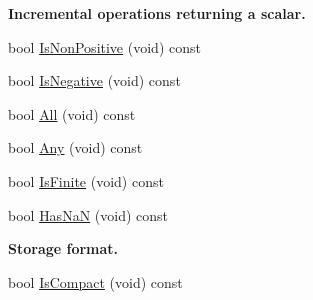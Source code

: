 \begin{Indent}{\bf Incremental operations returning a scalar.}
\begin{DoxyCompactItemize}
bool \hyperlink{classvct_dynamic_const_n_array_base_a6db845f0bc3dc8a202f01efcbd324534}{Is\-Non\-Positive} (void) const 
\item 
bool \hyperlink{classvct_dynamic_const_n_array_base_aa857ba5eb1c2e42c835d64812d189e02}{Is\-Negative} (void) const 
\item 
bool \hyperlink{classvct_dynamic_const_n_array_base_a28488dcd24829cba9e3d2a45d8627c16}{All} (void) const 
\item 
bool \hyperlink{classvct_dynamic_const_n_array_base_aae8f05f6031a18f2289f6bb3a7fb5062}{Any} (void) const 
\item 
bool \hyperlink{classvct_dynamic_const_n_array_base_a75a5eb704992360d1c94e61190e3e052}{Is\-Finite} (void) const 
\item 
bool \hyperlink{classvct_dynamic_const_n_array_base_ab610e1bff1589b1198abe536e7023e54}{Has\-Na\-N} (void) const 
\end{DoxyCompactItemize}
\end{Indent}
\begin{Indent}{\bf Storage format.}\par
\begin{DoxyCompactItemize}
\item 
bool \hyperlink{classvct_dynamic_const_n_array_base_a55cacc58ae8e57eba5121566689611dc}{Is\-Compact} (void) const 
\end{DoxyCompactItemize}
\end{Indent}
